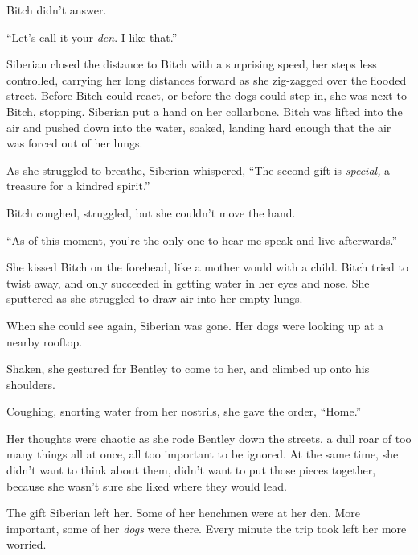 Bitch didn't answer.



``Let's call it your \emph{den}.  I like that.''



Siberian closed the distance to Bitch with a surprising speed, her steps less controlled, carrying her long distances forward as she zig-zagged over the flooded street.  Before Bitch could react, or before the dogs could step in, she was next to Bitch, stopping.  Siberian put a hand on her collarbone.  Bitch was lifted into the air and pushed down into the water, soaked, landing hard enough that the air was forced out of her lungs.



As she struggled to breathe, Siberian whispered, ``The second gift is \emph{special, }a treasure for a kindred spirit.''



Bitch coughed, struggled, but she couldn't move the hand.



``As of this moment, you're the only one to hear me speak and live afterwards.''



She kissed Bitch on the forehead, like a mother would with a child.  Bitch tried to twist away, and only succeeded in getting water in her eyes and nose.  She sputtered as she struggled to draw air into her empty lungs.



When she could see again, Siberian was gone.  Her dogs were looking up at a nearby rooftop.



Shaken, she gestured for Bentley to come to her, and climbed up onto his shoulders.



Coughing, snorting water from her nostrils, she gave the order, ``Home.''



Her thoughts were chaotic as she rode Bentley down the streets, a dull roar of too many things all at once, all too important to be ignored.  At the same time, she didn't want to think about them, didn't want to put those pieces together, because she wasn't sure she liked where they would lead.



The gift Siberian left her.  Some of her henchmen were at her den.  More important, some of her \emph{dogs} were there.  Every minute the trip took left her more worried.



